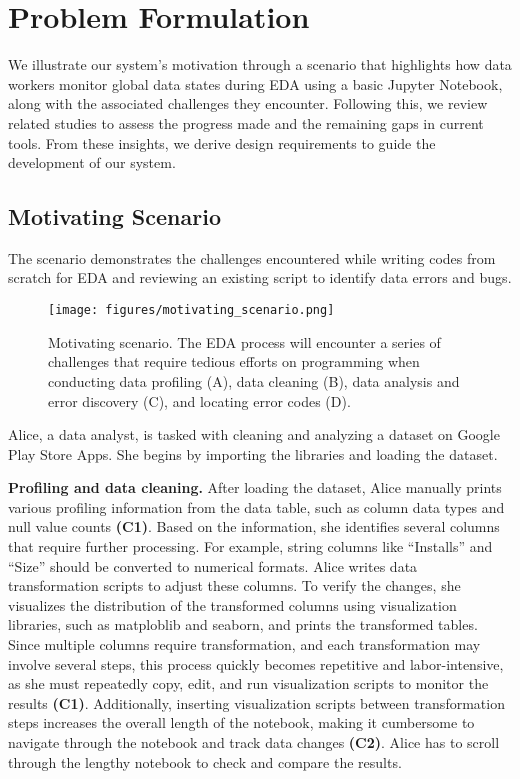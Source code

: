 \section{Problem Formulation}

We illustrate our system's motivation through a scenario that highlights how data workers monitor global data states during EDA using a basic Jupyter Notebook, along with the associated challenges they encounter. 
Following this, we review related studies to assess the progress made and the remaining gaps in current tools.
From these insights, we derive design requirements to guide the development of our system.

\subsection{Motivating Scenario}
\label{sec:motivate_scenario}

The scenario demonstrates the challenges encountered while writing codes from scratch for EDA and reviewing an existing script to identify data errors and bugs.

\begin{figure*}[!htb]
    \centering
    \texttt{[image: figures/motivating\_scenario.png]}
    \caption{Motivating scenario. The EDA process will encounter a series of challenges that require tedious efforts on programming when conducting data profiling (A), data cleaning (B), data analysis and error discovery (C), and locating error codes (D).}
    \label{fig:motivating_scenario}
\end{figure*}

Alice, a data analyst, is tasked with cleaning and analyzing a dataset on Google Play Store Apps. She begins by importing the libraries and loading the dataset. 

\textbf{Profiling and data cleaning. } 
After loading the dataset, Alice manually prints various profiling information from the data table, such as column data types and null value counts \textbf{(C1)}. 
Based on the information, she identifies several columns that require further processing. 
For example, string columns like ``Installs'' and ``Size'' should be converted to numerical formats. 
Alice writes data transformation scripts to adjust these columns.
To verify the changes, she visualizes the distribution of the transformed columns using visualization libraries, such as matploblib and seaborn, and prints the transformed tables. 
Since multiple columns require transformation, and each transformation may involve several steps, this process quickly becomes repetitive and labor-intensive, as she must repeatedly copy, edit, and run visualization scripts to monitor the results \textbf{(C1)}.
Additionally, inserting visualization scripts between transformation steps increases the overall length of the notebook, making it cumbersome to navigate through the notebook and track data changes \textbf{(C2)}. 
Alice has to scroll through the lengthy notebook to check and compare the results.


